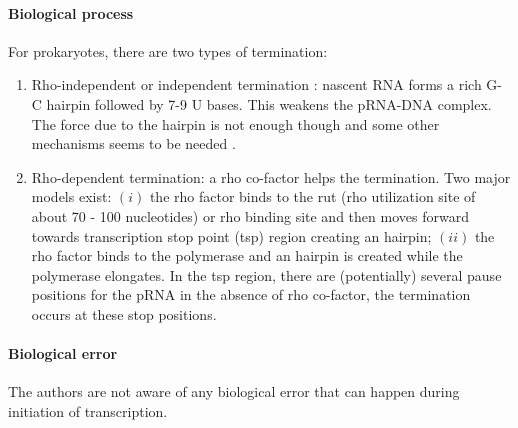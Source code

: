 \paragraph{Biological process} For prokaryotes, there are two types of termination:
\begin{enumerate}
  \item Rho-independent or independent termination \cite{GuN:99,WaG:10}: nascent RNA forms a rich G-C hairpin followed by 7-9 U bases. This weakens the pRNA-DNA complex. The force due to the hairpin is not enough though and some other mechanisms seems to be needed \cite{HeB:08}.
  \item Rho-dependent termination: a rho co-factor helps the termination. Two major models exist: $(i)$ the rho factor binds to the rut (rho utilization site of about 70 - 100 nucleotides) or rho binding site and then moves forward towards transcription stop point (tsp) region creating an hairpin; $(ii)$ the rho factor binds to the polymerase \cite{EDWN:10} and an hairpin is created while the polymerase elongates. In the tsp region, there are (potentially) several pause positions for the pRNA in the absence of rho co-factor, the termination occurs at these stop positions.
\end{enumerate}


\paragraph{Biological error} The authors are not aware of any biological error that can happen during initiation of transcription.


